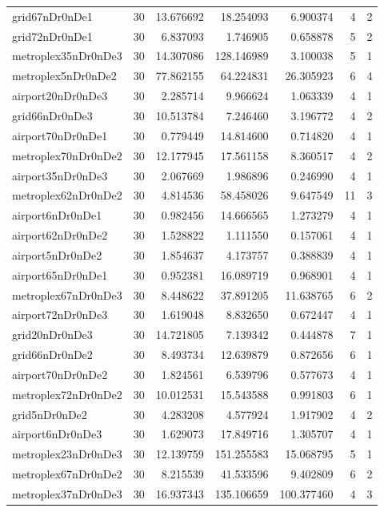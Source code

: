 \documentclass[../../../thesis.tex]{subfiles}
\begin{document}
\begin{longtable}{|l|r|r|r|r|r|r|}
grid67nDr0nDe1 & 30 & 13.676692 & 18.254093 & 6.900374 & 4 & 2 \\
grid72nDr0nDe1 & 30 & 6.837093 & 1.746905 & 0.658878 & 5 & 2 \\
metroplex35nDr0nDe3 & 30 & 14.307086 & 128.146989 & 3.100038 & 5 & 1 \\
metroplex5nDr0nDe2 & 30 & 77.862155 & 64.224831 & 26.305923 & 6 & 4 \\
airport20nDr0nDe3 & 30 & 2.285714 & 9.966624 & 1.063339 & 4 & 1 \\
grid66nDr0nDe3 & 30 & 10.513784 & 7.246460 & 3.196772 & 4 & 2 \\
airport70nDr0nDe1 & 30 & 0.779449 & 14.814600 & 0.714820 & 4 & 1 \\
metroplex70nDr0nDe2 & 30 & 12.177945 & 17.561158 & 8.360517 & 4 & 2 \\
airport35nDr0nDe3 & 30 & 2.067669 & 1.986896 & 0.246990 & 4 & 1 \\
metroplex62nDr0nDe2 & 30 & 4.814536 & 58.458026 & 9.647549 & 11 & 3 \\
airport6nDr0nDe1 & 30 & 0.982456 & 14.666565 & 1.273279 & 4 & 1 \\
airport62nDr0nDe2 & 30 & 1.528822 & 1.111550 & 0.157061 & 4 & 1 \\
airport5nDr0nDe2 & 30 & 1.854637 & 4.173757 & 0.388839 & 4 & 1 \\
airport65nDr0nDe1 & 30 & 0.952381 & 16.089719 & 0.968901 & 4 & 1 \\
metroplex67nDr0nDe3 & 30 & 8.448622 & 37.891205 & 11.638765 & 6 & 2 \\
airport72nDr0nDe3 & 30 & 1.619048 & 8.832650 & 0.672447 & 4 & 1 \\
grid20nDr0nDe3 & 30 & 14.721805 & 7.139342 & 0.444878 & 7 & 1 \\
grid66nDr0nDe2 & 30 & 8.493734 & 12.639879 & 0.872656 & 6 & 1 \\
airport70nDr0nDe2 & 30 & 1.824561 & 6.539796 & 0.577673 & 4 & 1 \\
metroplex72nDr0nDe2 & 30 & 10.012531 & 15.543588 & 0.991803 & 6 & 1 \\
grid5nDr0nDe2 & 30 & 4.283208 & 4.577924 & 1.917902 & 4 & 2 \\
airport6nDr0nDe3 & 30 & 1.629073 & 17.849716 & 1.305707 & 4 & 1 \\
metroplex23nDr0nDe3 & 30 & 12.139759 & 151.255583 & 15.068795 & 5 & 1 \\
metroplex67nDr0nDe2 & 30 & 8.215539 & 41.533596 & 9.402809 & 6 & 2 \\
metroplex37nDr0nDe3 & 30 & 16.937343 & 135.106659 & 100.377460 & 4 & 3 \\

\end{longtable}
\end{document}
